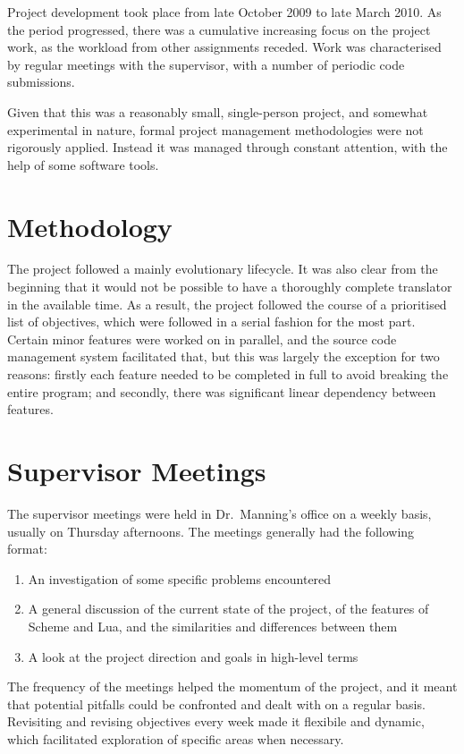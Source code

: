 Project development took place from late October 2009 to late March 2010. As
the period progressed, there was a cumulative increasing focus on the project
work, as the workload from other assignments receded. Work was characterised by
regular meetings with the supervisor, with a number of periodic code
submissions.

Given that this was a reasonably small, single-person project, and somewhat
experimental in nature, formal project management methodologies were not
rigorously applied. Instead it was managed through constant attention, with the
help of some software tools.


\section{Methodology}

The project followed a mainly evolutionary lifecycle. It was also clear from the
beginning that it would not be possible to have a thoroughly complete translator
in the available time.  As a result, the project followed the course of a
prioritised list of objectives, which were followed in a serial fashion for the
most part.  Certain minor features were worked on in parallel, and the source
code management system facilitated that, but this was largely the exception for
two reasons: firstly each feature needed to be completed in full to avoid
breaking the entire program; and secondly, there was significant linear
dependency between features.


\section{Supervisor Meetings}

The supervisor meetings were held in Dr.\ Manning's office on a weekly basis,
usually on Thursday afternoons. The meetings generally had the following format:

\begin{enumerate}
\item An investigation of some specific problems encountered
\item A general discussion of the current state of the project, of the
features of Scheme and Lua, and the similarities and differences between
them
\item A look at the project direction and goals in high-level terms
\end{enumerate}

The frequency of the meetings helped the momentum of the project, and it meant
that potential pitfalls could be confronted and dealt with on a regular basis.
Revisiting and revising objectives every week made it flexibile and dynamic,
which facilitated exploration of specific areas when necessary.


